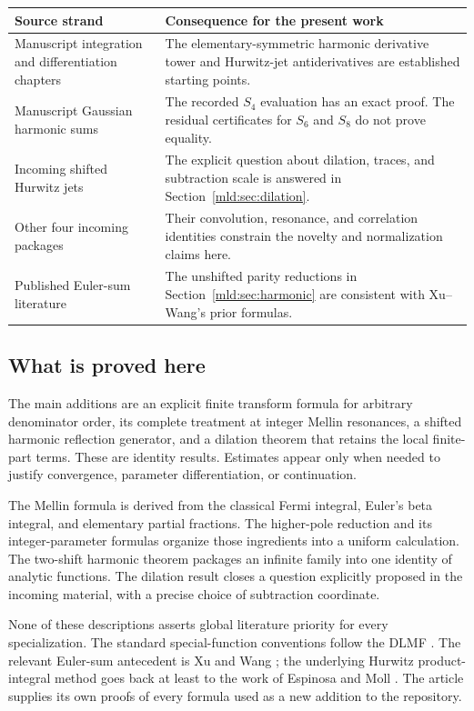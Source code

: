 \begin{center}
\begin{tabularx}{\textwidth}{@{}>{\raggedright\arraybackslash}p{}Y@{}}
\toprule
Source strand & Consequence for the present work\\
\midrule
Manuscript integration and differentiation chapters & The elementary-symmetric harmonic derivative tower and Hurwitz-jet antiderivatives are established starting points.\\
Manuscript Gaussian harmonic sums & The recorded $S_4$ evaluation has an exact proof. The residual certificates for $S_6$ and $S_8$ do not prove equality.\\
Incoming shifted Hurwitz jets & The explicit question about dilation, traces, and subtraction scale is answered in Section~\ref{mld:sec:dilation}.\\
Other four incoming packages & Their convolution, resonance, and correlation identities constrain the novelty and normalization claims here.\\
Published Euler-sum literature & The unshifted parity reductions in Section~\ref{mld:sec:harmonic} are consistent with Xu--Wang's prior formulas.\\
\bottomrule
\end{tabularx}
\end{center}

\subsection{What is proved here}

The main additions are an explicit finite transform formula for arbitrary denominator order, its complete treatment at integer Mellin resonances, a shifted harmonic reflection generator, and a dilation theorem that retains the local finite-part terms. These are identity results. Estimates appear only when needed to justify convergence, parameter differentiation, or continuation.

The Mellin formula is derived from the classical Fermi integral, Euler's beta integral, and elementary partial fractions. The higher-pole reduction and its integer-parameter formulas organize those ingredients into a uniform calculation. The two-shift harmonic theorem packages an infinite family into one identity of analytic functions. The dilation result closes a question explicitly proposed in the incoming material, with a precise choice of subtraction coordinate.

None of these descriptions asserts global literature priority for every specialization. The standard special-function conventions follow the DLMF \cite{DLMFpoly,DLMFlerch,DLMFhurwitz,DLMFgamma}. The relevant Euler-sum antecedent is Xu and Wang \cite{XuWang}; the underlying Hurwitz product-integral method goes back at least to the work of Espinosa and Moll \cite{EspinosaMoll}. The article supplies its own proofs of every formula used as a new addition to the repository.

